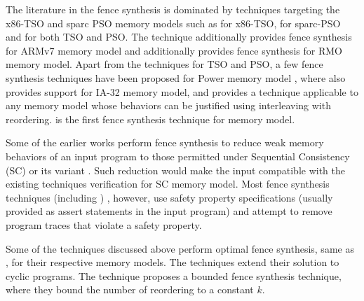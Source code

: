 The literature in the  fence synthesis is dominated by 
techniques targeting the x86-TSO and sparc PSO memory models
such as \cite{abdulla2012counter,alglave2010fences,alglave2014don,linden2011verification,abdulla2012automatic,abdulla2015best,bender2015declarative} 
for x86-TSO,
\cite{abdulla2015precise,linden2013verification} 
for sparc-PSO and \cite{liu2012dynamic,meshman2014synthesis,abdulla2013memorax,joshi2015property,kuperstein2012automatic}
for both TSO and PSO.
%
The technique \cite{bender2015declarative} additionally
provides fence synthesis for ARMv7 memory model and 
\cite{kuperstein2012automatic} additionally provides
fence synthesis for RMO memory model.
%
Apart from the techniques for TSO and PSO, a few 
fence synthesis techniques have been proposed for Power
memory model 
\cite{alglave2010fences,abdulla2015precise,fang2003automatic}, 
where \cite{fang2003automatic} also 
provides support for IA-32 memory model, and
\cite{joshi2015property} provides a technique applicable to
any memory model whose behaviors can be justified using
interleaving with reordering.
%
\ourtechnique is the first fence synthesis technique for 
\cc memory model.

Some of the earlier works  
\cite{alglave2010fences,abdulla2015precise,fang2003automatic} 
perform fence synthesis to reduce weak memory behaviors of an 
input program to those permitted under Sequential Consistency (SC)
or its variant \cite{abdulla2015best}. Such reduction would
make the input compatible with the existing techniques 
verification for SC memory model.
%
Most fence synthesis techniques (including \ourtechnique)
\cite{meshman2014synthesis}\cite{abdulla2012counter}\cite{abdulla2013memorax}\cite{joshi2015property}\cite{abdulla2015precise}\cite{linden2011verification}\cite{kuperstein2012automatic}\cite{abdulla2012automatic}\cite{linden2013verification}, however, 
use safety property specifications (usually provided as assert
statements in the input program) and attempt to remove 
program traces that violate a safety property.

Some of the techniques discussed above
\cite{meshman2014synthesis}\cite{taheri2019polynomial}\cite{abdulla2012counter}\cite{abdulla2013memorax}\cite{joshi2015property}\cite{abdulla2015precise}\cite{kuperstein2012automatic}\cite{bender2015declarative} perform optimal fence synthesis, 
same as \ourtechnique, for their respective memory models.
%
The techniques \cite{linden2011verification}\cite{linden2013verification} 
extend their solution to cyclic programs.
%
The technique \cite{joshi2015property} proposes a bounded 
fence synthesis technique, where they bound the number of 
reordering to a constant $k$.